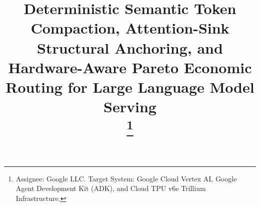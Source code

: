 \documentclass[conference,10pt]{IEEEtran}
\begin{document}
\title{Deterministic Semantic Token Compaction, Attention-Sink Structural Anchoring, and Hardware-Aware Pareto Economic Routing for Large Language Model Serving\\
\thanks{Assignee: Google LLC. Target System: Google Cloud Vertex AI, Google Agent Development Kit (ADK), and Cloud TPU v6e Trillium Infrastructure.}
}

\author{
}

\maketitle
\end{document}

